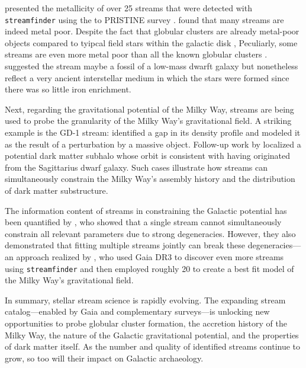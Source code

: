    \citet{2022MNRAS.516.5331M} presented the metallicity of over 25 streams that were detected with \texttt{streamfinder} using the to PRISTINE survey \citep{2017MNRAS.471.2587S}. \citet{2022MNRAS.516.5331M} found that many streams are indeed metal poor. Despite the fact that globular clusters are already metal-poor objects compared to tyipcal field stars within the galactic disk \citep{2006ARA&A..44..193B}, Peculiarly, some streams are even more metal poor than all the known globular clusters \citet{2020Natur.583..768W,2025A&A...698A..82Y}. \citet{2022MNRAS.516.5331M} suggested the stream maybe a fossil of a low-mass dwarft galaxy but nonetheless reflect a very ancient interstellar medium in which the stars were formed since there was so little iron enrichment. 
    
    Next, regarding the gravitational potential of the Milky Way, streams are being used to probe the granularity of the Milky Way's gravitational field. A striking example is the GD-1 stream: \citet{2019ApJ...880...38B} identified a gap in its density profile and modeled it as the result of a perturbation by a massive object. Follow-up work by \citet{2020ApJ...892L..37B} localized a potential dark matter subhalo whose orbit is consistent with having originated from the Sagittarius dwarf galaxy. Such cases illustrate how streams can simultaneously constrain the Milky Way's assembly history and the distribution of dark matter substructure.

    The information content of streams in constraining the Galactic potential has been quantified by \citet{2018ApJ...867..101B}, who showed that a single stream cannot simultaneously constrain all relevant parameters due to strong degeneracies. However, they also demonstrated that fitting multiple streams jointly can break these degeneracies—an approach realized by \citet{2024ApJ...967...89I}, who used Gaia DR3 to discover even more streams using \texttt{streamfinder} and then employed roughly 20 to create a best fit model of the Milky Way's gravitational field.

    In summary, stellar stream science is rapidly evolving. The expanding stream catalog—enabled by Gaia and complementary surveys—is unlocking new opportunities to probe globular cluster formation, the accretion history of the Milky Way, the nature of the Galactic gravitational potential, and the properties of dark matter itself. As the number and quality of identified streams continue to grow, so too will their impact on Galactic archaeology.

